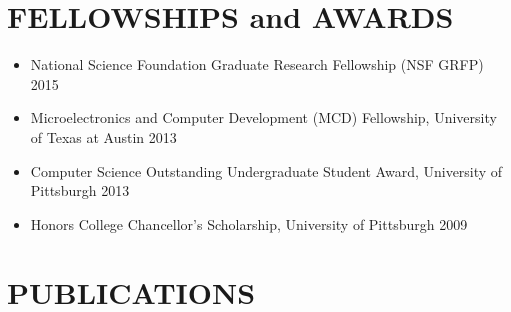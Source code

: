 \documentclass{res}
\begin{document}
\begin{resume}
 \section{FELLOWSHIPS and AWARDS}

 \begin{itemize}
  \item National Science Foundation Graduate Research Fellowship (NSF GRFP) \hfill 2015
  \item Microelectronics and Computer Development (MCD) Fellowship, University of Texas at Austin \hfill 2013
  \item Computer Science Outstanding Undergraduate Student Award, University of Pittsburgh \hfill 2013
  \item Honors College Chancellor's Scholarship, University of Pittsburgh \hfill 2009
\end{itemize}

\section{PUBLICATIONS}


\end{resume}
\end{document}
